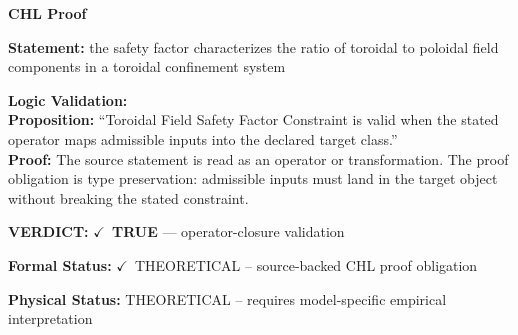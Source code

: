 \vspace{0.45em}
\noindent\textbf{CHL Proof}\par
\textbf{Statement:} the safety factor characterizes the ratio of toroidal to poloidal field components in a
toroidal confinement system

\textbf{Logic Validation:}\\
\textbf{Proposition:} ``Toroidal Field Safety Factor Constraint is valid when the stated operator maps
admissible inputs into the declared target class.''\\
\textbf{Proof:} The source statement is read as an operator or transformation. The proof obligation is
type preservation: admissible inputs must land in the target object without breaking the
stated constraint.

\textbf{VERDICT:} \ensuremath{\checkmark}\ \textbf{TRUE} --- operator-closure validation

\textbf{Formal Status:} \ensuremath{\checkmark}\ THEORETICAL -- source-backed CHL proof obligation

\textbf{Physical Status:} THEORETICAL -- requires model-specific empirical interpretation
\par\vspace{0.45em}
\par
\ifTZPDarkEdition
{}
\fi
\endgroup
\endgroup
